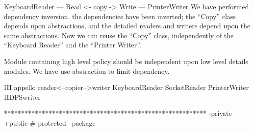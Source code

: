 \documentclass{report}
\begin{document}
KeyboardReader --- Read <- copy -> Write --- PrinterWriter
We have performed dependency inversion. the dependencies have been inverted; the “Copy” class depends upon abstractions, and the detailed readers and writers depend upon the same abstractions.
Now we can reuse the “Copy” class, independently of the “Keyboard Reader” and the “Printer Writer”. 

Module containing high level policy should be independent upon low level details modules. We have use abstraction to limit dependency.

III appello 
                         reader<--copier-->writer
KeyboardReader SocketReader                   PrinterWriter HDFSwriter

***********************************************************
-private +public \# protected ~package
\end{document}
